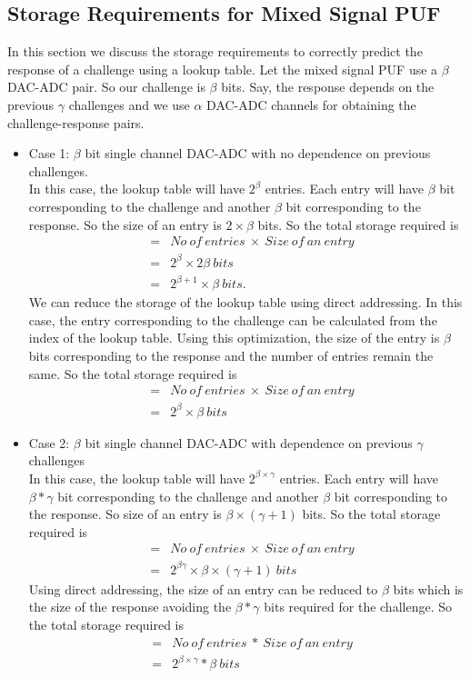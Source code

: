 \begin{itemize}
\begin{itemize}
\subsection{Storage Requirements for Mixed Signal PUF}
In this section we discuss the storage requirements to correctly predict the response of a challenge using a lookup table. Let the mixed signal PUF use a $\beta$ DAC-ADC pair. So our challenge is $\beta$ bits. Say, the response depends on the previous $\gamma$ challenges and we use $\alpha$ DAC-ADC channels for obtaining the challenge-response pairs.
\begin{itemize}
\item Case 1: $\beta$ bit single channel DAC-ADC with no dependence on previous challenges.\\
In this case, the lookup table will have $2^{\beta}$ entries. Each entry will have $\beta$ bit corresponding to the challenge and another $\beta$ bit corresponding to the response. So the size of an entry is $2\times\beta$ bits. So the total storage required is
\begin{eqnarray}
&=& No\ of\ entries\ \times\ Size\ of\ an \ entry  \nonumber \\
&=& 2^{\beta} \times 2{\beta}\ bits \nonumber \\
&=& 2^{\beta + 1}\times\beta\ bits.
\end{eqnarray}
We can reduce the storage of the lookup table using direct addressing. In this case, the entry corresponding to the challenge can be calculated from the index of the lookup table. Using this optimization, the size of the entry is $\beta$ bits corresponding to the response and the number of entries remain the same. So the total storage required is
\begin{eqnarray}
&=& No\ of\ entries\ \times\ Size\ of\ an \ entry  \nonumber\\
&=& 2^{\beta} \times {\beta}\ bits
\end{eqnarray}


\item Case 2: $\beta$ bit single channel DAC-ADC with dependence on previous $\gamma$ challenges\\
In this case, the lookup table will have $2^{\beta\times\gamma}$ entries. Each entry will have $\beta*\gamma$ bit corresponding to the challenge and another $\beta$ bit corresponding to the response. So size of an entry is $\beta\times(\gamma + 1)$ bits. So the total storage required is
\begin{eqnarray}
&=& No\ of\ entries\ \times\ Size\ of\ an \ entry  \nonumber \\
&=& 2^{\beta\gamma} \times \beta\times(\gamma + 1)\ bits 
\end{eqnarray}
Using direct addressing, the size of an entry can be reduced to $\beta$ bits which is the size of the response avoiding the $\beta*\gamma$ bits required for the challenge. So the total storage required is
\begin{eqnarray}
&=& No\ of\ entries\ *\ Size\ of\ an \ entry  \nonumber\\
&=& 2^{\beta\times\gamma} * {\beta}\ bits
\end{eqnarray}


\end{itemize}
\end{itemize}
\end{itemize}
